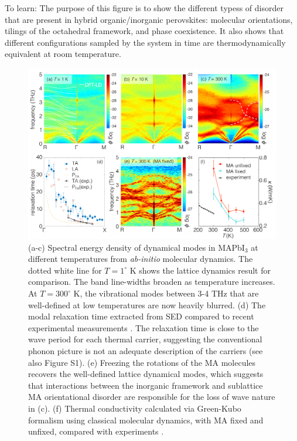 \documentclass[journal=cmatex,manuscript=article]{achemso}
\begin{document}
To learn: The purpose of this figure is to show the different typess of disorder that are present in hybrid organic/inorganic perovskites: molecular orientations, tilings of the octahedral framework, and phase coexistence. It also shows that different configurations sampled by  the system in time are thermodynamically equivalent at room temperature. 



\newpage

\begin{figure}[!hbtp] %
\centering
\includegraphics[width=6in]{Figure2.pdf}
\caption{\label{fig2} 
(a-c) Spectral energy density of dynamical modes in MAPbI$_3$ at different  temperatures from {\it ab-initio} molecular dynamics. 
The dotted white line for $T = 1^\circ$ K shows the lattice dynamics result for comparison. 
The band line-widths broaden as temperature increases. 
At $T=300^\circ$ K, the vibrational modes between 3-4 THz that are well-defined at low temperatures are now heavily blurred. 
(d) The modal relaxation time extracted from SED compared to recent experimental measurements \cite{gold2018acoustic}. 
The relaxation time is close to the wave period for each thermal carrier, suggesting the conventional phonon picture is not an adequate description of the carriers (see also Figure S1). %
(e) Freezing the rotations of the MA molecules recovers the well-defined lattice dynamical modes, which suggests that interactions between the inorganic framework and sublattice MA orientational disorder are responsible for the loss of wave nature in (c).
(f) Thermal conductivity calculated via Green-Kubo formalism using classical molecular dynamics, with MA fixed and unfixed, compared with experiments \cite{kovalsky2017thermal}. 
}
\end{figure} %
\end{document}
